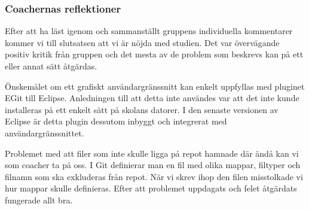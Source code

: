 \subsubsection{Coachernas reflektioner}
Efter att ha läst igenom och sammanställt gruppens individuella kommentarer kommer vi till slutsatsen att vi är nöjda med studien. Det var övervägande positiv kritik från gruppen och det mesta av de problem som beskrevs kan på ett eller annat sätt åtgärdas.

Önskemålet om ett grafiskt användargränssnitt kan enkelt uppfyllas med pluginet EGit till Eclipse. Anledningen till att detta inte användes var att det inte kunde installeras på ett enkelt sätt på skolans datorer. I den senaste versionen av Eclipse är detta plugin dessutom inbyggt och integrerat med användargränssnittet.

Problemet med att filer som inte skulle ligga på repot hamnade där ändå kan vi som coacher ta på oss. I Git definierar man en fil med olika mappar, filtyper och filnamn som ska exkluderas från repot. När vi skrev ihop den filen misstolkade vi hur mappar skulle definieras. Efter att problemet uppdagats och felet åtgärdats fungerade allt bra.